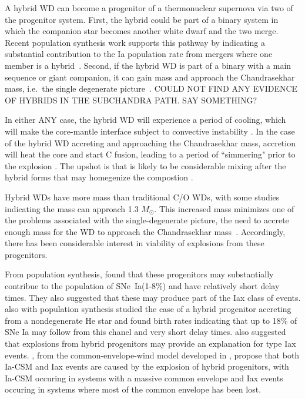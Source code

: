 \documentclass[iop,apj]{emulateapj}
\newcommand{\SNeIa}{SNe~Ia}
\newcommand{\Msun}{\ensuremath{M_\odot}}
\begin{document}
A hybrid WD can become a progenitor of a thermonuclear supernova via two 
of the progenitor system. 
First, the hybrid could be part of a binary system in which the companion star becomes
another white dwarf and the two merge. Recent population synthesis work supports
this pathway by indicating a substantial contribution to the Ia population rate from 
mergers where one member is a hybrid~\citep{yungelsonkuranov2017}. Second, if the hybrid 
WD is part of a binary with a main sequence or giant companion, it can gain mass and 
approach the Chandrasekhar mass, i.e.\  the single degenerate picture~\citep{willcoxetal2016}. 
{\color{red} COULD NOT FIND ANY EVIDENCE OF HYBRIDS IN THE SUBCHANDRA PATH. SAY 
SOMETHING?}

In either {\color{red}ANY} case, the hybrid WD will experience a period of cooling, which will
make the core-mantle interface subject to convective 
instability \citep{brooksetal2017,schwabgaraud2018}. In the case of the 
hybrid WD accreting and approaching the Chandrasekhar mass, accretion will
heat the core and start C fusion, leading to a period of ``simmering" prior
to the explosion \citep{PiroBild08}. The upshot is that is likely to be considerable
mixing after the hybrid forms that may homegenize the compostion 
\citep{denissenkovetal2015,brooksetal2017,schwabgaraud2018}.

Hybrid WDs have more mass than traditional C/O WDs, with some studies indicating the
mass can approach 1.3 \Msun \citep{chenetal2014}. This increased mass
minimizes one of the problems associated with the single-degenerate picture,
the need to accrete enough mass for the WD to approach the Chandrasekhar
mass~\citep{chenetal2014,denissenkovetal2015,kromeretal2015}.
Accordingly, there has been considerable interest in viability of explosions from 
these progenitors. 

From population synthesis, \citet{mengpods2014} found that these
progenitors may substantially contribue to the population of \SNeIa (1-8\%) and have
relatively short delay times. They also suggested that these 
may produce part of the Iax class of events. \citet{Wangetal2014} also with population
synthesis studied the case
of a hybrid progenitor accreting from a nondegenerate He star and found
birth rates indicating that up to 18\% of SNe Ia may follow from this chanel
and very short delay times. \citet{Wangetal2014} also suggested that explosions 
from hybrid progenitors may provide an explanation for type Iax events.
\citet{mengpods2018}, from the common-envelope-wind model developed in 
\citep{mengpods2014}, propose that both Ia-CSM and Iax events 
are caused by the explosion of hybrid progenitors, with Ia-CSM occuring in systems with 
a massive common envelope and Iax events occuring in systems where most of the common envelope
has been lost.
\end{document}
